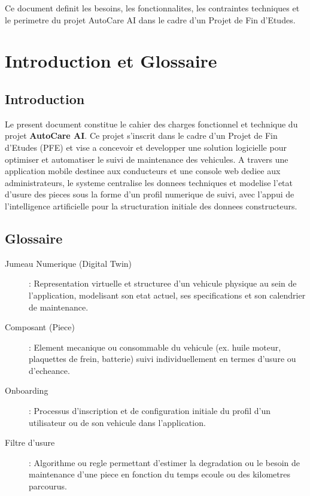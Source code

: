 \documentclass[11pt,a4paper]{report}
\begin{document}
\begin{titlepage}
    \vspace{1.5cm}
    
    \begin{center}
        \small \color{gray}
        Ce document definit les besoins, les fonctionnalites, les contraintes techniques et le perimetre du projet AutoCare AI dans le cadre d'un Projet de Fin d'Etudes.
    \end{center}
\end{titlepage}

\newpage
\tableofcontents
\newpage

\chapter{Introduction et Glossaire}

\section{Introduction}
Le present document constitue le cahier des charges fonctionnel et technique du projet \textbf{AutoCare AI}. Ce projet s'inscrit dans le cadre d'un Projet de Fin d'Etudes (PFE) et vise a concevoir et developper une solution logicielle pour optimiser et automatiser le suivi de maintenance des vehicules. A travers une application mobile destinee aux conducteurs et une console web dediee aux administrateurs, le systeme centralise les donnees techniques et modelise l'etat d'usure des pieces sous la forme d'un profil numerique de suivi, avec l'appui de l'intelligence artificielle pour la structuration initiale des donnees constructeurs.

\section{Glossaire}
\begin{description}
    \item[Jumeau Numerique (Digital Twin)] : Representation virtuelle et structuree d'un vehicule physique au sein de l'application, modelisant son etat actuel, ses specifications et son calendrier de maintenance.
    \item[Composant (Piece)] : Element mecanique ou consommable du vehicule (ex. huile moteur, plaquettes de frein, batterie) suivi individuellement en termes d'usure ou d'echeance.
    \item[Onboarding] : Processus d'inscription et de configuration initiale du profil d'un utilisateur ou de son vehicule dans l'application.
    \item[Filtre d'usure] : Algorithme ou regle permettant d'estimer la degradation ou le besoin de maintenance d'une piece en fonction du temps ecoule ou des kilometres parcourus.
\end{description}
\end{document}
